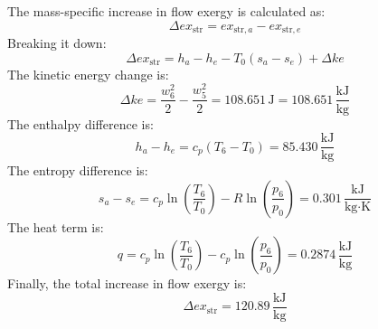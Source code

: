The mass-specific increase in flow exergy is calculated as:  
\[
\Delta ex_{\text{str}} = ex_{\text{str},a} - ex_{\text{str},e}
\]  
Breaking it down:  
\[
\Delta ex_{\text{str}} = h_a - h_e - T_0 \left( s_a - s_e \right) + \Delta ke
\]  
The kinetic energy change is:  
\[
\Delta ke = \frac{w_6^2}{2} - \frac{w_5^2}{2} = 108.651 \, \text{J} = 108.651 \, \frac{\text{kJ}}{\text{kg}}
\]  
The enthalpy difference is:  
\[
h_a - h_e = c_p \left( T_6 - T_0 \right) = 85.430 \, \frac{\text{kJ}}{\text{kg}}
\]  
The entropy difference is:  
\[
s_a - s_e = c_p \ln \left( \frac{T_6}{T_0} \right) - R \ln \left( \frac{p_6}{p_0} \right) = 0.301 \, \frac{\text{kJ}}{\text{kg·K}}
\]  
The heat term is:  
\[
q = c_p \ln \left( \frac{T_6}{T_0} \right) - c_p \ln \left( \frac{p_6}{p_0} \right) = 0.2874 \, \frac{\text{kJ}}{\text{kg}}
\]  
Finally, the total increase in flow exergy is:  
\[
\Delta ex_{\text{str}} = 120.89 \, \frac{\text{kJ}}{\text{kg}}
\]